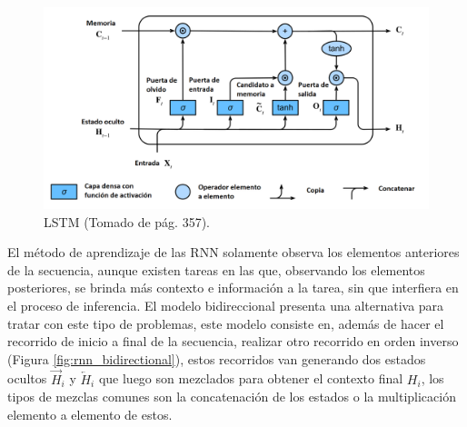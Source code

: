 \begin{figure}[h!]
	\begin{center}
		\begin{center}
			\includegraphics[scale=.4]{Graphics/rnn_lstm.png}
        \end{center}
	    \caption{LSTM (Tomado de \textcite{d2l} pág. 357).}\label{fig:rnn_lstm}
	\end{center}
\end{figure}

El método de aprendizaje de las RNN solamente observa los elementos anteriores de la secuencia, aunque existen
tareas en las que, observando los elementos posteriores, se brinda más contexto e información a la tarea, sin que interfiera
en el proceso de inferencia. El modelo bidireccional presenta una alternativa para tratar con este tipo de problemas, 
este modelo consiste en, además de hacer el recorrido de inicio a final de la secuencia, realizar otro recorrido en orden 
inverso (Figura \ref{fig:rnn_bidirectional}), estos recorridos van generando dos estados ocultos $\overrightarrow{H}_{i}$ y $\overleftarrow{H}_{i}$
que luego son mezclados para obtener el contexto final $H_i$, los tipos de mezclas comunes son la concatenación de los 
estados o la multiplicación elemento a elemento de estos.

